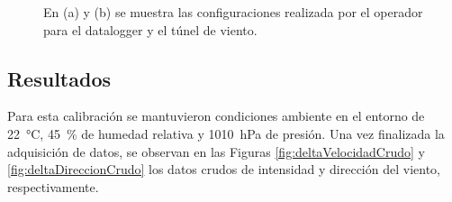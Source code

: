 \begin{figure}[H]
\begin{minipage}[b]{0.18\textwidth}
    \end{minipage}  
    \hspace{1em} %
    \begin{minipage}[b]{0.23\textwidth}
        \centering
    \end{minipage}  
    \caption{En (a) y (b) se muestra las configuraciones realizada por el operador para el datalogger y el túnel de viento.}
    \label{fig:configEquiposDelta}
\end{figure} 


\subsection{Resultados}

Para esta calibración se mantuvieron condiciones ambiente en el entorno de \SI{22}{\degreeCelsius}, \SI{45}{\%} de humedad relativa y \SI{1010}{\hecto\pascal} de presión. Una vez finalizada la adquisición de datos, se observan en las Figuras \ref{fig:deltaVelocidadCrudo} y \ref{fig:deltaDireccionCrudo} los datos crudos de intensidad y dirección del viento, respectivamente. 

